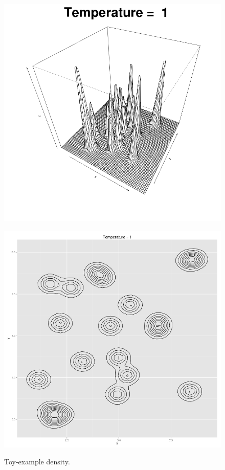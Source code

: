 \begin{figure}
	\begin{minipage}[b]{.5\linewidth}
		\centering \includegraphics[scale=.25]{./img/Liang_perspective.png}
		\label{LiangContour}
	\end{minipage}%
	\begin{minipage}[b]{.5\linewidth}
		\centering \includegraphics[scale=.25]{./img/Liang_Contour_plot.png}
	\label{LiangPerspective}
	\end{minipage}
	\caption{Toy-example density.}\label{ToyExample}
\end{figure}


